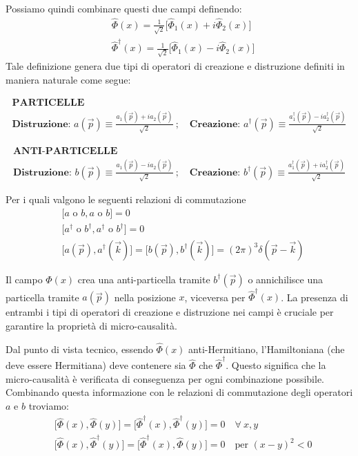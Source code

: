 \documentclass[../main.tex]{subfiles}
\begin{document}
Possiamo quindi combinare questi due campi definendo:
\begin{align*}
    &\hat{\Phi}(x) = \frac{1}{\sqrt{2}}\big[ \hat{\Phi}_1(x) + i \hat{\Phi}_2(x)\big]\\
    &\hat{\Phi}^\dagger(x) = \frac{1}{\sqrt{2}}\big[ \hat{\Phi}_1(x) - i \hat{\Phi}_2(x)\big]
\end{align*}
Tale definizione genera due tipi di operatori di creazione e distruzione definiti in maniera naturale come segue:


\begin{gather*}
    \textbf{PARTICELLE}\\
    \textbf{Distruzione: }a(\Vec{p}) \equiv \frac{a_1(\Vec{p})+ia_2(\Vec{p})}{\sqrt{2}} ~;\quad 
    \textbf{Creazione: } a^\dagger(\Vec{p}) \equiv \frac{a_1^\dagger(\Vec{p})-ia_2^\dagger(\Vec{p})}{\sqrt{2}}
\end{gather*}

\begin{gather*}
    \textbf{ANTI-PARTICELLE}\\
    \textbf{Distruzione: } b(\Vec{p}) \equiv \frac{a_1(\Vec{p})-ia_2(\Vec{p})}{\sqrt{2}} ~;\quad 
    \textbf{Creazione: } b^\dagger(\Vec{p}) \equiv \frac{a_1^\dagger(\Vec{p})+ia_2^\dagger(\Vec{p})}{\sqrt{2}}
\end{gather*}

Per i quali valgono le seguenti relazioni di commutazione
\begin{align*}
    &\big[ a \text{ o }b, a \text{ o }b \big] = 0\\
    &\big[ a^\dagger \text{ o }b^\dagger, a^\dagger \text{ o }b^\dagger \big] = 0\\
    &\big[a(\Vec{p}), a^\dagger(\Vec{k}) \big] = \big[b(\Vec{p}), b^\dagger(\Vec{k}) \big] =(2\pi)^3\delta(\Vec{p}-\Vec{k})
\end{align*}

Il campo $\hat{\Phi}(x)$ crea una anti-particella tramite $b^\dagger(\Vec{p})$ o annichilisce una particella tramite $a(\Vec{p})$ nella posizione $x$, viceversa per $\hat{\Phi}^\dagger(x)$. La presenza di entrambi i tipi di operatori di creazione e distruzione nei campi è cruciale per garantire la proprietà di micro-causalità. 

Dal punto di vista tecnico, essendo $\hat{\Phi}(x)$ anti-Hermitiano, l'Hamiltoniana (che deve essere Hermitiana) deve contenere sia $\hat{\Phi}$ che $\hat{\Phi}^\dagger$. Questo significa che la micro-causalità è verificata di conseguenza per ogni combinazione possibile. Combinando questa informazione con le relazioni di commutazione degli operatori $a$ e $b$ troviamo:
\[\begin{aligned}
    &\big[ \hat{\Phi}(x),\hat{\Phi}(y) \big] = \big[ \hat{\Phi}^\dagger(x),\hat{\Phi}^\dagger(y) \big] = 0 \quad \forall~x,y\\
    &\big[ \hat{\Phi}(x),\hat{\Phi}^\dagger(y) \big] = \big[ \hat{\Phi}^\dagger(x),\hat{\Phi}(y) \big] = 0 \quad \text{per }(x-y)^2<0
\end{aligned}
\]
\end{document}
